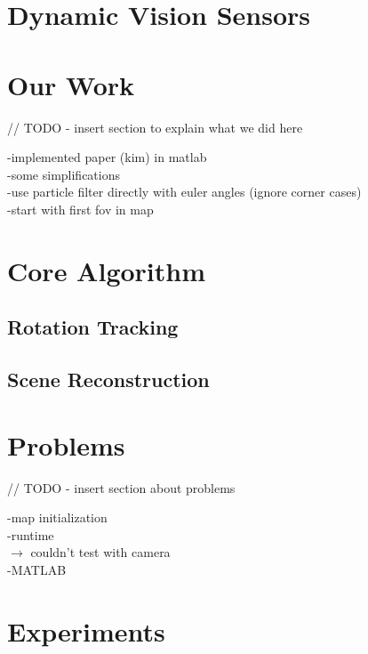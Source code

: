 \documentclass[10pt,twocolumn,letterpaper]{article}
\begin{document}
\section{Dynamic Vision Sensors}



\section{Our Work}

// TODO - insert section to explain what we did here

-implemented paper (kim) in matlab\\
-some simplifications\\
	-use particle filter directly with euler angles (ignore corner cases)\\
	-start with first fov in map\\
	
\section{Core Algorithm}



\subsection{Rotation Tracking}



\subsection{Scene Reconstruction}



\section{Problems}

// TODO - insert section about problems

-map initialization\\
-runtime\\
$\rightarrow$ couldn't test with camera\\
-MATLAB\\


\section{Experiments}
\end{document}
